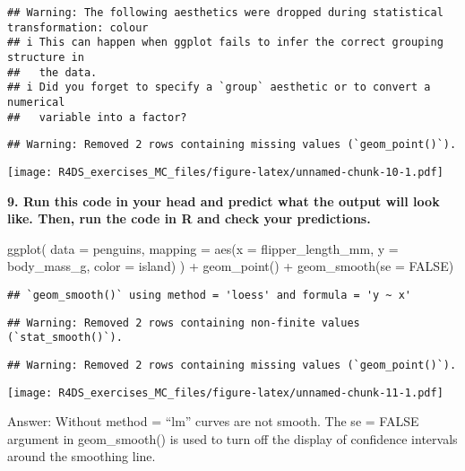 \documentclass[
]{article}
\newenvironment{Shaded}{\begin{snugshade}}{\end{snugshade}}
\newcommand{\AttributeTok}[1]{\textcolor[rgb]{0.77,0.63,0.00}{#1}}
\newcommand{\ConstantTok}[1]{\textcolor[rgb]{0.00,0.00,0.00}{#1}}
\newcommand{\FunctionTok}[1]{\textcolor[rgb]{0.00,0.00,0.00}{#1}}
\newcommand{\NormalTok}[1]{#1}
\newcommand{\SpecialCharTok}[1]{\textcolor[rgb]{0.00,0.00,0.00}{#1}}
\begin{document}
\begin{verbatim}
## Warning: The following aesthetics were dropped during statistical transformation: colour
## i This can happen when ggplot fails to infer the correct grouping structure in
##   the data.
## i Did you forget to specify a `group` aesthetic or to convert a numerical
##   variable into a factor?
\end{verbatim}

\begin{verbatim}
## Warning: Removed 2 rows containing missing values (`geom_point()`).
\end{verbatim}

\texttt{[image: R4DS\_exercises\_MC\_files/figure-latex/unnamed-chunk-10-1.pdf]}

\textbf{9. Run this code in your head and predict what the output will
look like. Then, run the code in R and check your predictions.}

\begin{Shaded}
\begin{Highlighting}[]
\FunctionTok{ggplot}\NormalTok{(}
  \AttributeTok{data =}\NormalTok{ penguins,}
  \AttributeTok{mapping =} \FunctionTok{aes}\NormalTok{(}\AttributeTok{x =}\NormalTok{ flipper\_length\_mm, }\AttributeTok{y =}\NormalTok{ body\_mass\_g, }\AttributeTok{color =}\NormalTok{ island)}
\NormalTok{) }\SpecialCharTok{+}
  \FunctionTok{geom\_point}\NormalTok{() }\SpecialCharTok{+}
  \FunctionTok{geom\_smooth}\NormalTok{(}\AttributeTok{se =} \ConstantTok{FALSE}\NormalTok{)}
\end{Highlighting}
\end{Shaded}

\begin{verbatim}
## `geom_smooth()` using method = 'loess' and formula = 'y ~ x'
\end{verbatim}

\begin{verbatim}
## Warning: Removed 2 rows containing non-finite values (`stat_smooth()`).
\end{verbatim}

\begin{verbatim}
## Warning: Removed 2 rows containing missing values (`geom_point()`).
\end{verbatim}

\texttt{[image: R4DS\_exercises\_MC\_files/figure-latex/unnamed-chunk-11-1.pdf]}

Answer: Without method = ``lm'' curves are not smooth. The se = FALSE
argument in geom\_smooth() is used to turn off the display of confidence
intervals around the smoothing line.
\end{document}

